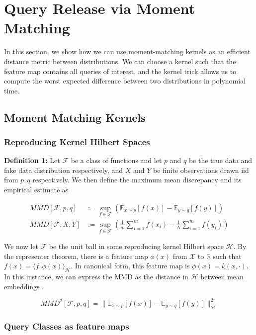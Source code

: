 \documentclass[
]{article}
\begin{document}
\section{Query Release via Moment Matching}

In this section, we show how we can use moment-matching kernels as an efficient distance metric between distributions. We can choose a kernel such that the feature map contains all queries of interest, and the kernel trick allows us to  compute the worst expected difference between two distributions in polynomial time.

\subsection{Moment Matching Kernels}

\subsubsection{Reproducing Kernel Hilbert Spaces}

\textbf{Definition 1:} Let \(\mathcal{F}\) be a class of functions and
let \(p\) and \(q\) be the true data and fake data distribution
respectively, and \(X\) and \(Y\) be finite observations drawn iid from
\(p,q\) respectively. We then define the maximum mean discrepancy and
its empirical estimate as

\begin{align}
  MMD[\mathcal{F},p,q] &:= \sup_{f\in\mathcal{F}} ( \mathbb{E}_{x\sim p}[f(x)] - \mathbb{E}_{y\sim q}[f(y)])\\
  MMD[\mathcal{F},X,Y] &:= \sup_{f\in\mathcal{F}} ( \frac{1}{m} \sum_{i=1}^m f(x_i) -  \frac{1}N \sum_{i=1}^m f(y_i) )
\end{align}

We now let $\mathcal{F}$ be the unit ball in some reproducing kernel Hilbert space $\mathcal{H}$. By the representer theorem, there is a feature map $\phi(x)$ from $\mathcal{X}$ to $\mathbb{R}$ such that $f(x) = \langle f, \phi(x) \rangle_\mathcal{H}$. In canonical form, this feature map is $\phi(x) = k(x, \cdot)$. In this instance, we can express the MMD as the distance in $\mathcal{H}$ between mean embeddings \cite{GBR+12}.

\begin{equation}
  MMD^2[\mathcal{F}, p, q] = \| \mathbb{E}_{x\sim p}[f(x)] - \mathbb{E}_{y\sim q}[f(y)] \|^2_\mathcal{H}
\end{equation}

\subsubsection{Query Classes as feature maps}
\end{document}

